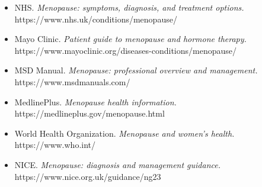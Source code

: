 \begin{itemize}
    \item NHS. \textit{Menopause: symptoms, diagnosis, and treatment options.} https://www.nhs.uk/conditions/menopause/
    \item Mayo Clinic. \textit{Patient guide to menopause and hormone therapy.} https://www.mayoclinic.org/diseases-conditions/menopause/
    \item MSD Manual. \textit{Menopause: professional overview and management.} https://www.msdmanuals.com/
    \item MedlinePlus. \textit{Menopause health information.} https://medlineplus.gov/menopause.html
    \item World Health Organization. \textit{Menopause and women's health.} https://www.who.int/
    \item NICE. \textit{Menopause: diagnosis and management guidance.} https://www.nice.org.uk/guidance/ng23
\end{itemize}
